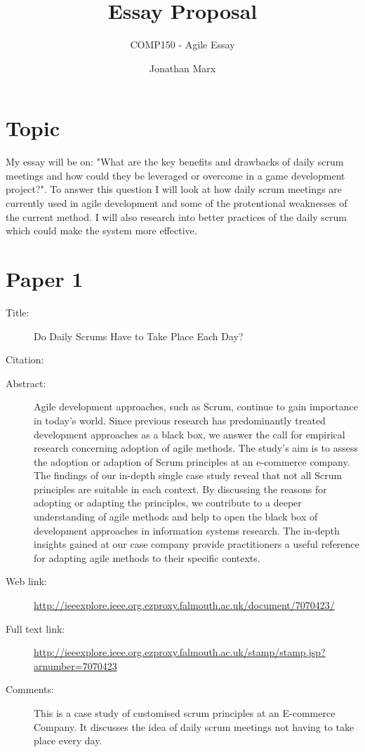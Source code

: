 \documentclass{scrartcl}
\title{Essay Proposal}
\subtitle{COMP150 - Agile Essay}
\author{Jonathan Marx}
\begin{document}
\maketitle

\section*{Topic}

My essay will be on: "What are the key benefits and drawbacks of daily scrum meetings and how could they be leveraged or overcome in a game development project?". To answer this question I will look at how daily scrum meetings are currently used in agile development and some of the protentional weaknesses of the current method. I will also research into better practices of the daily scrum which could make the system more effective.


\section*{Paper 1}
\begin{description}
\item[Title:] Do Daily Scrums Have to Take Place Each Day?
\item[Citation:] \cite{shannon}
\item[Abstract:] Agile development approaches, such as Scrum, continue to gain importance in today's world. Since previous research has predominantly treated development approaches as a black box, we answer the call for empirical research concerning adoption of agile methods. The study's aim is to assess the adoption or adaption of Scrum principles at an e-commerce company. The findings of our in-depth single case study reveal that not all Scrum principles are suitable in each context. By discussing the reasons for adopting or adapting the principles, we contribute to a deeper understanding of agile methods and help to open the black box of development approaches in information systems research. The in-depth insights gained at our case company provide practitioners a useful reference for adapting agile methods to their specific contexts.
\item[Web link:] \url{http://ieeexplore.ieee.org.ezproxy.falmouth.ac.uk/document/7070423/}
\item[Full text link:] \url{http://ieeexplore.ieee.org.ezproxy.falmouth.ac.uk/stamp/stamp.jsp?arnumber=7070423}
\item[Comments:] This is a case study of customised scrum principles at an E-commerce Company. It discusses the idea of daily scrum meetings not having to take place every day. 
\end{description}
\end{document}
